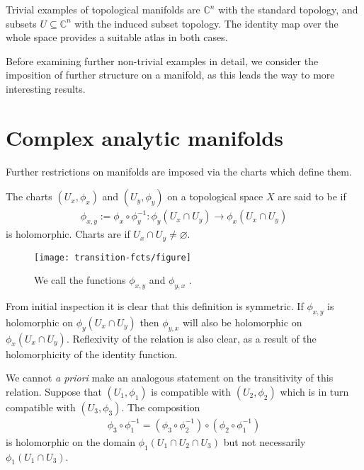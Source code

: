 \begin{example}\label{ex:C-top-manifold}
	Trivial examples of topological manifolds are $ \mathbb{C}^{n} $ with the
	standard topology, and subsets $ U \subseteq \mathbb{C}^{n} $ with the induced
	subset topology. The identity map over the whole space provides a suitable atlas
	in both cases.
\end{example}

Before examining further non-trivial examples in detail, we consider the
imposition of further structure on a manifold, as this leads the way to more
interesting results.

\section{Complex analytic manifolds}
Further restrictions on manifolds are imposed via the charts which define them.

\begin{definition}
	The charts $ (U_x, \phi_x) $ and $ (U_y, \phi_y) $ on a topological space $ X $
	are said to be  if
	\begin{align*}
		\phi _{x,y}:= \phi_x \circ \phi_y ^{-1}: \phi_y(U_x \cap U_y) \to \phi_x(U_x
		\cap U_y)
	\end{align*}
	is holomorphic. Charts are  if $ U_{x}\cap
		U_{y}\neq\varnothing $.
\end{definition}

\begin{figure*}
	\centering
	\texttt{[image: transition-fcts/figure]}
	\caption{We call the functions $ \phi _{x,y} $ and $ \phi _{y,x} $ .}
\end{figure*}

\begin{remark}
	From initial inspection it is clear that this definition is
	symmetric\sidenotemark. If $ \phi _{x,y}$ is holomorphic on $ \phi_y(U_x \cap
		U_y) $ then $ \phi _{y,x} $ will also be holomorphic on $ \phi_x(U_x \cap U_y)
	$. Reflexivity of the relation is also clear, as a result of the holomorphicity
	of the identity function.

	We cannot \textit{a priori} make an analogous statement on the transitivity of
	this relation. Suppose that $ (U_1, \phi_1) $ is compatible with $ (U_2, \phi_2)
	$ which is in turn compatible with $ (U_3, \phi_3) $. The composition
	\begin{align*}
		\phi_3 \circ \phi_1 ^{-1} = \left( \phi_3 \circ \phi_2 ^{-1} \right) \circ
		\left( \phi_2 \circ \phi_1 ^{-1} \right)
	\end{align*}
	is holomorphic on the domain $ \phi_1(U_1 \cap U_2 \cap U_3) $ but not
	necessarily $ \phi_1(U_1 \cap U_3) $.
\end{remark}

